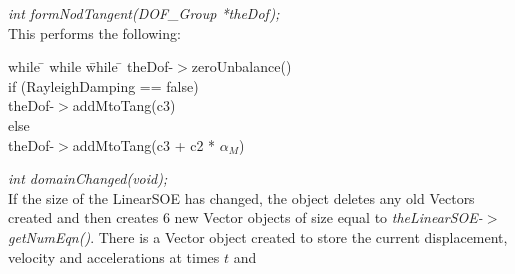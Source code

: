 {\em int formNodTangent(DOF\_Group *theDof);} \\
This performs the following:
\begin{tabbing}
while \= \+ while \= while \= \kill
theDof-$>$zeroUnbalance() \\
if (RayleighDamping == false)  \+ \\
theDof-$>$addMtoTang(c3)  \- \\
else \+ \\
theDof-$>$addMtoTang(c3 + c2 * $\alpha_M$)  \- \\ 
\end{tabbing}


{\em int domainChanged(void);}\\
If the size of the LinearSOE has changed, the object deletes any old Vectors
created and then creates $6$ new Vector objects of size equal to {\em
theLinearSOE-$>$getNumEqn()}. There is a Vector object created to store
the current displacement, velocity and accelerations at times $t$ and
